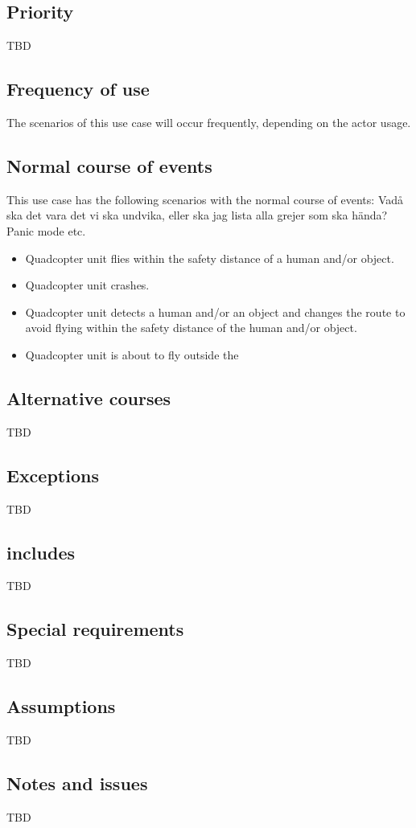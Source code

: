 \documentclass[a4paper]{article}
\begin{document}
\subsection{Priority}
TBD
\subsection{Frequency of use}
The scenarios of this use case will occur frequently, depending on the actor usage.
\subsection{Normal course of events}
This use case has the following scenarios with the normal course of events:
Vadå ska det vara det vi ska undvika, eller ska jag lista alla grejer som ska hända? Panic mode etc.
\begin{itemize}
\item Quadcopter unit flies within the safety distance of a human and/or object.
\item Quadcopter unit crashes.
\item Quadcopter unit detects a human and/or an object and changes the route to avoid flying within the safety distance of the human and/or object.
\item Quadcopter unit is about to fly outside the 
\end{itemize}
\subsection{Alternative courses}
TBD
\subsection{Exceptions}
TBD
\subsection{includes}
TBD
\subsection{Special requirements}
TBD
\subsection{Assumptions}
TBD
\subsection{Notes and issues}
TBD
\end{document}
